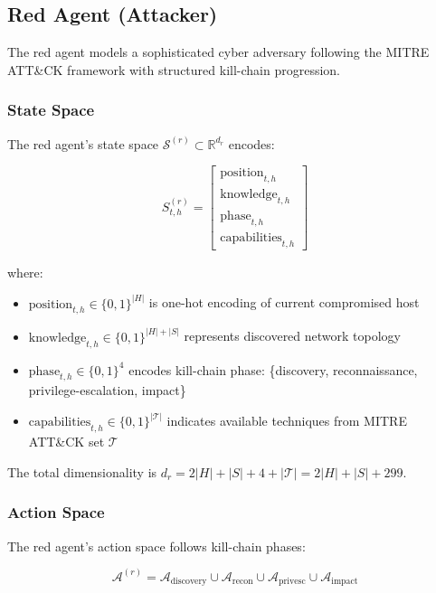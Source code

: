 \documentclass[11pt]{article}
\newcounter{phase}[algorithm]
\theoremstyle{definition}
\theoremstyle{plain}
\newcommand{\MC}[1]{\mathcal{#1}}
\begin{document}
\subsection{Red Agent (Attacker)}

The red agent models a sophisticated cyber adversary following the MITRE ATT\&CK framework with structured kill-chain progression.

\subsubsection{State Space}
The red agent's state space $\MC{S}^{(r)} \subset \mathbb{R}^{d_r}$ encodes:

\begin{equation}
S_{t,h}^{(r)} = \begin{bmatrix}
\text{position}_{t,h} \\
\text{knowledge}_{t,h} \\
\text{phase}_{t,h} \\
\text{capabilities}_{t,h}
\end{bmatrix}
\end{equation}

where:
\begin{itemize}
    \item $\text{position}_{t,h} \in \{0,1\}^{|H|}$ is one-hot encoding of current compromised host
    \item $\text{knowledge}_{t,h} \in \{0,1\}^{|H| + |S|}$ represents discovered network topology
    \item $\text{phase}_{t,h} \in \{0,1\}^4$ encodes kill-chain phase: \{discovery, reconnaissance, privilege-escalation, impact\}
    \item $\text{capabilities}_{t,h} \in \{0,1\}^{|\MC{T}|}$ indicates available techniques from MITRE ATT\&CK set $\MC{T}$
\end{itemize}

The total dimensionality is $d_r = 2|H| + |S| + 4 + |\MC{T}| = 2|H| + |S| + 299$.

\subsubsection{Action Space}
The red agent's action space follows kill-chain phases:

\begin{equation}
\MC{A}^{(r)} = \MC{A}_{\text{discovery}} \cup \MC{A}_{\text{recon}} \cup \MC{A}_{\text{privesc}} \cup \MC{A}_{\text{impact}}
\end{equation}
\end{document}
